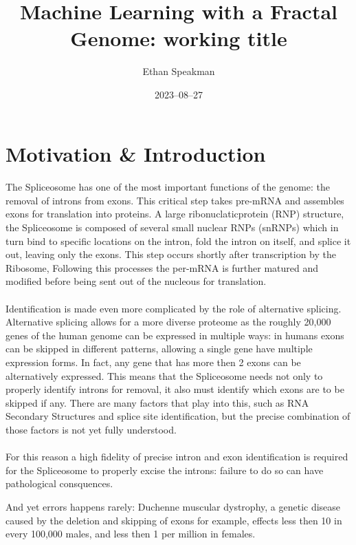 \documentclass[12pt]{article}
\title{Machine Learning with a Fractal Genome: working title}
\author{Ethan Speakman}
\date{2023–08–27}
\begin{document}
\maketitle

\section{Motivation \& Introduction}
\paragraph*{}
The Spliceosome has one of the most important functions of the genome: the removal of introns from exons. 
This critical step takes pre-mRNA and assembles exons for translation into proteins. 
A large ribonuclaticprotein (RNP) structure, the Spliceosome is composed of several small nuclear RNPs (snRNPs) which in turn bind to specific locations on the intron, fold the intron on itself, and splice it out, leaving only the exons\cite{will2011spliceosome}\cite{matera2014day}.
This step occurs shortly after transcription by the Ribosome, 
Following this processes the per-mRNA is further matured and modified before being sent out of the nucleous for translation.
\paragraph*{}
Identification is made even more complicated by the role of alternative splicing.
Alternative splicing allows for a more diverse proteome as the roughly 20,000 genes of the human genome can be expressed in multiple ways: in humans exons can be skipped in different patterns, allowing a single gene have multiple expression forms.
In fact, any gene that has more then 2 exons can be alternatively expressed.
This means that the Spliceosome needs not only to properly identify introns for removal, it also must identify which exons are to be skipped if any.
There are many factors that play into this, such as RNA Secondary Structures and splice site identification, but the precise combination of those factors is not yet fully understood.
\paragraph*{}
For this reason a high fidelity of precise intron and exon identification is required for the Spliceosome to properly excise the introns: failure to do so can have pathological consquences.

And yet errors happens rarely: Duchenne muscular dystrophy, a genetic disease caused by the deletion and skipping of exons for example, effects less then 10 in every 100,000 males, and less then 1 per million in females.
\end{document}
